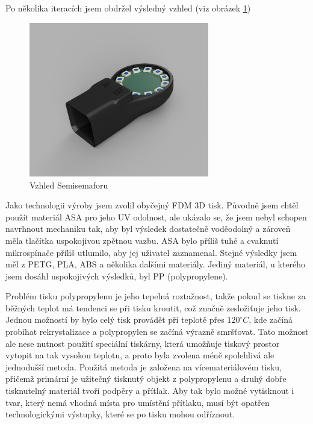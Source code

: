 Po několika iteracích jsem obdržel výsledný vzhled (viz obrázek \ref{Semisemafor-box-render})
\begin{figure}[!h]
  \begin{center}
    \includegraphics[width=0.7\textwidth]{text/PraktickaCast/img/Semisemafor-BOX-render.png}
  \end{center}
  \label{Semisemafor-box-render}
  \caption{Vzhled Semisemaforu}
\end{figure}

Jako technologii výroby jsem zvolil obyčejný FDM 3D tisk.
Původně jsem chtěl použít materiál ASA pro jeho UV odolnost, ale ukázalo se, že jsem nebyl schopen navrhnout mechaniku tak, aby byl výsledek dostatečně voděodolný a zároveň měla tlačítka uspokojivou zpětnou vazbu.
ASA bylo příliš tuhé a cvaknutí mikrospínače příliš utlumilo, aby jej uživatel zaznamenal.
Stejné výsledky jsem měl z PETG, PLA, ABS a několika dalšími materiály. Jediný materiál, u kterého jsem dosáhl uspokojivých výsledků, byl PP (polypropylene).

Problém tisku polypropylenu je jeho tepelná roztažnost, takže pokud se tiskne za běžných teplot má tendenci se při tisku kroutit, což značně zesložiťuje jeho tisk.
Jednou možností by bylo celý tisk provádět při teplotě přes \(120^\circ C\), kde začíná probíhat rekrystalizace a polypropylen se začíná výrazně smršťovat.
Tato možnost ale nese nutnost použití speciální tiskárny, která umožňuje tiskový prostor vytopit na tak vysokou teplotu, a proto byla zvolena méně spolehlivá ale jednodušší metoda.
Použitá metoda je založena na vícemateriálovém tisku, přičemž primární je užitečný tisknutý objekt z polypropylenu a druhý dobře tisknutelný materiál tvoří podpěry a přítlak.
Aby tak bylo možné vytisknout i tvar, který nemá vhodná místa pro umístění přítlaku, musí být opatřen technologickými výstupky, které se po tisku mohou odříznout.

